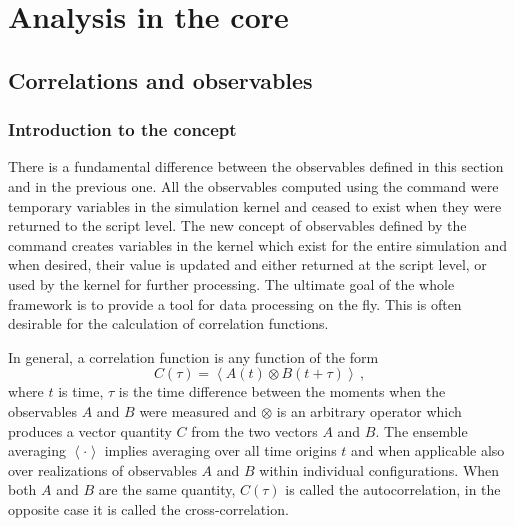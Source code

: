 %  
%   
%  
%  
%
\newcommand{\taumax}{\tau_{\mathrm{max}}}
\newcommand{\taumin}{\tau_{\mathrm{min}}}

\chapter{Analysis in the core}
\label{chap:analysis-core}

\section{Correlations and observables}

\subsection{Introduction to the concept}
There is a fundamental difference between the observables defined in this
section and in the previous one. All the observables computed using the
 command were temporary variables in the simulation kernel
and ceased to exist when they were returned to the script level.
The new concept of observables defined by the  command
creates variables in the kernel which exist for the entire simulation 
and when desired, their value is updated and either returned at the 
script level, or used by the kernel for further processing.
The ultimate goal of the whole framework is to provide a tool for
data processing on the fly. This is often desirable for 
the calculation of correlation functions. 

In general, a correlation function is any function of the form
\begin{equation}
C(\tau) = \left<A\left(t\right) \otimes B\left(t+\tau\right)\right>\,,
\label{eq:CtauDef}
\end{equation}
where $t$ is time, $\tau$ is the time difference between the moments
when the observables $A$ and $B$ were measured and $\otimes$ is an
arbitrary operator which produces a vector quantity 
$C$ from the two vectors $A$ and $B$. The ensemble averaging $\left< \cdot \right>$
implies averaging over all time origins $t$ and when applicable also
over realizations of observables $A$ and $B$ within individual configurations.
When both $A$ and $B$ are
the same quantity, $C(\tau)$ is called the autocorrelation, 
in the opposite case it is called the cross-correlation.

